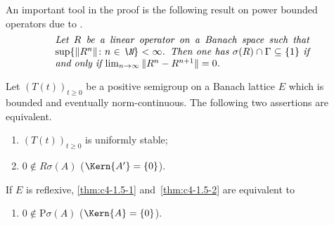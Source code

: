 An important tool in the proof is the following result on power bounded operators due to \textcite{katznelsontzafriri:1984}.
\begin{equation}\label{eq:c4-1.4}
\begin{minipage}{.75\linewidth}
\textit{Let $R$ be a linear operator on a Banach space such that $\sup\{ \|R^{n}\| \colon n \in \N \} < \infty$. 
Then one has $\sigma(R) \cap \Gamma \subseteq \{1\}$ if and only if 
$ \lim_{n \to \infty} \|R^{n} - R^{n+1}\| = 0$.}
\end{minipage}
\end{equation}
\begin{theorem}\label{thm:c4-1.5}%
Let $(T(t))_{t\geq 0}$ be a positive semigroup on a Banach lattice $E$ which is bounded and eventually norm-continuous.
The following two assertions are equivalent.
\begin{enumerate}[\upshape (a)]
    \item \label{thm:c4-1.5-1}
    $(T(t))_{t\geq 0}$ is uniformly stable;
    
    \item \label{thm:c4-1.5-2}
    $0 \notin R\sigma(A)$ (\ie  $\Kern{A'} 
    = \{0\}$).
\end{enumerate}
If $E$ is reflexive, \ref{thm:c4-1.5-1} and~\ref{thm:c4-1.5-2} are equivalent to
\begin{enumerate}

\item  \label{thm:c4-1.5-3}
$0 \notin \text{P}\sigma(A)$ (\ie  $\Kern{A} = \{0\}$).
\end{enumerate}
\end{theorem}
